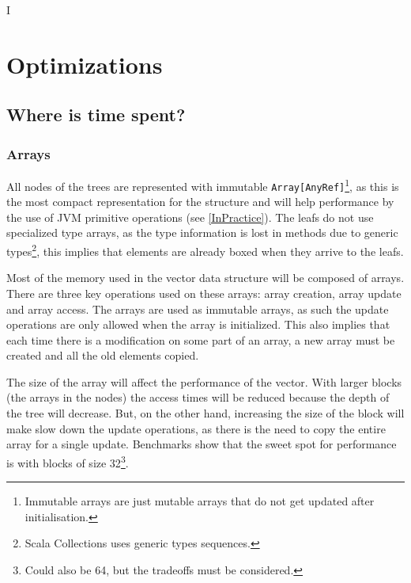 I%

\chapter{Optimizations} %

\label{Optimizations} %



\section{Where is time spent?}
\label{WhereIsTimeSpent}

\subsection{Arrays}
All nodes of the trees are represented with immutable \texttt{Array[AnyRef]}\footnote{Immutable arrays are just mutable arrays that do not get updated after initialisation.}, as this is the most compact representation for the structure and will help performance by the use of JVM primitive operations (see \ref{InPractice}). The leafs do not use specialized type arrays, as the type information is lost in methods due to generic types\footnote{Scala Collections \cite{collect11} uses generic types sequences.}, this implies that elements are already boxed when they arrive to the leafs.

Most of the memory used in the vector data structure will be composed of arrays. There are three key operations used on these arrays: array creation, array update and array access. The arrays are used as immutable arrays, as such the update operations are only allowed when the array is initialized. This also implies that each time there is a modification on some part of an array, a new array must be created and all the old elements copied.  

The size of the array will affect the performance of the vector. With larger blocks (the arrays in the nodes) the access times will be reduced because the depth of the tree will decrease. But, on the other hand, increasing the size of the block will make slow down the update operations, as there is the need to copy the entire array for a single update. Benchmarks show that the sweet spot for performance is with blocks of size 32\footnote{Could also be 64, but the tradeoffs must be considered.}.


